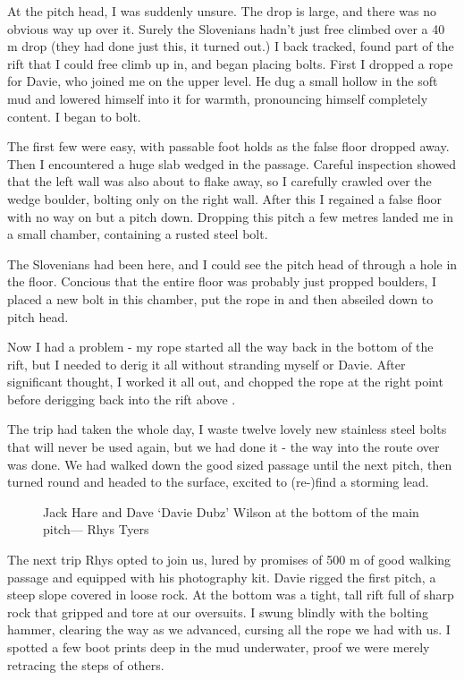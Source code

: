 At the pitch head, I was suddenly unsure. The drop is large, and there was no obvious way up over it. Surely the Slovenians hadn't just free climbed over a 40 m drop (they had done just this, it turned out.) I back tracked, found part of the rift that I could free climb up in, and began placing bolts. First I dropped a rope for Davie, who joined me on the upper level. He dug a small hollow in the soft mud and lowered himself into it for warmth, pronouncing himself completely content. I began to bolt.

The first few were easy, with passable foot holds as the false floor dropped away. Then I encountered a huge slab wedged in the passage. Careful inspection showed that the left wall was also about to flake away, so I carefully crawled over the wedge boulder, bolting only on the right wall. After this I regained a false floor with no way on but a pitch down. Dropping this pitch a few metres landed me in a small chamber, containing a rusted steel bolt.

The Slovenians had been here, and I could see the pitch head of  through a hole in the floor. Concious that the entire floor was probably just propped boulders, I placed a new bolt in this chamber, put the rope in and then abseiled down to  pitch head.

Now I had a problem - my rope started all the way back in the bottom of the rift, but I needed to derig it all without stranding myself or Davie. After significant thought, I worked it all out, and chopped the rope at the right point before derigging back into the rift above . 

The trip had taken the whole day, I waste twelve lovely new stainless steel bolts that will never be used again, but we had done it - the way into the route over  was done. We had walked down the good sized passage until the next pitch, then turned round and headed to the surface, excited to (re-)find a storming lead.

\begin{figure}[t!]
\checkoddpage \ifoddpage \forcerectofloat \else \forceversofloat \fi
\centering
{}
\caption{Jack Hare and Dave `Davie Dubz' Wilson at the bottom of the \protect{} main pitch--- Rhys Tyers}
\label{Elec dreams main pitch}
\end{figure}

The next trip Rhys opted to join us, lured by promises of 500 m of good walking passage and equipped with his photography kit. Davie rigged the first pitch, a steep slope covered in loose rock. At the bottom was a tight, tall rift full of sharp rock that gripped and tore at our oversuits. I swung blindly with the bolting hammer, clearing the way as we advanced, cursing all the rope we had with us. I spotted a few boot prints deep in the mud underwater, proof we were merely retracing the steps of others.

